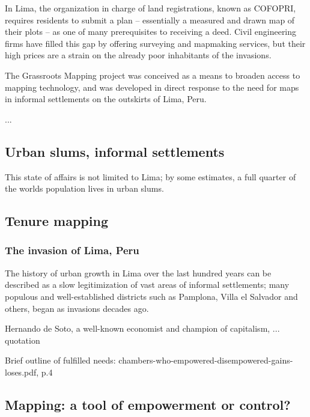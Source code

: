 \documentclass[11pt]{report}
\begin{document}
In Lima, the organization in charge of land registrations, known as COFOPRI, requires residents to submit a plan -- essentially a measured and drawn map of their plots -- as one of many prerequisites to receiving a deed. Civil engineering firms have filled this gap by offering surveying and mapmaking services, but their high prices are a strain on the already poor inhabitants of the invasions.  


The Grassroots Mapping project was conceived as a means to broaden access to mapping technology, and was developed in direct response to the need for maps in informal settlements on the outskirts of Lima, Peru.

...

\subsection{Urban slums, informal settlements}

This state of affairs is not limited to Lima; by some estimates, a full quarter of the worlds population lives in urban slums. 


\subsection{Tenure mapping}

\subsubsection{The invasion of Lima, Peru}

The history of urban growth in Lima over the last hundred years can be described as a slow legitimization of vast areas of informal settlements; many populous and well-established districts such as Pamplona, Villa el Salvador and others, began as invasions decades ago.

Hernando de Soto, a well-known economist and champion of capitalism, ... quotation

Brief outline of fulfilled needs: chambers-who-empowered-disempowered-gains-loses.pdf, p.4

\subsection{Mapping: a tool of empowerment or control?}
\end{document}
